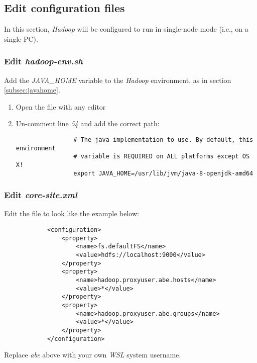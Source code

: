 \documentclass{article}
\begin{document}
    \subsection{Edit configuration files}
    In this section, \emph{Hadoop} will be configured to run in single-node mode (i.e., on a single PC).

        \subsubsection{Edit \emph{hadoop-env.sh}}
        Add the \emph{JAVA\_HOME} variable to the \emph{Hadoop} environment, as in section \ref{subsec:javahome}.

        \begin{enumerate}
            \item Open the file  with any editor
            
            \item Un-comment line \emph{54} and add the correct path:
            \begin{verbatim}
                # The java implementation to use. By default, this environment
                # variable is REQUIRED on ALL platforms except OS X!
                export JAVA_HOME=/usr/lib/jvm/java-8-openjdk-amd64
            \end{verbatim}
        \end{enumerate}

        \subsubsection{Edit \emph{core-site.xml}}
        Edit the file  to look like the example below:
        \begin{verbatim}
            <configuration>
                <property>
                    <name>fs.defaultFS</name>
                    <value>hdfs://localhost:9000</value>
                </property>
                <property>
                    <name>hadoop.proxyuser.abe.hosts</name>
                    <value>*</value>
                </property>
                <property>
                    <name>hadoop.proxyuser.abe.groups</name>
                    <value>*</value>
                </property>
            </configuration>
        \end{verbatim}
        Replace \emph{abe} above with your own \emph{WSL} system username.
\end{document}
